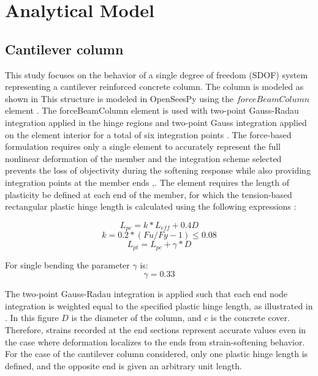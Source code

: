 \section{Analytical Model}
\subsection{Cantilever column}
This study focuses on the behavior of a single degree of freedom (SDOF) system representing a cantilever reinforced concrete column. The column is modeled as shown in  This structure is modeled in OpenSeesPy \cite{McKenna2010}\cite{Zhu2018} using the $forceBeamColumn$ element \cite{Scott}. The forceBeamColumn element is used with two-point Gauss-Radau integration applied in the hinge regions and two-point Gauss integration applied on the element interior for a total of six integration points \cite{Scott}. The force-based formulation requires only a single element to accurately represent the full nonlinear deformation of the member and the integration scheme selected prevents the loss of objectivity during the softening response while also providing integration points at the member ends \cite{Calabrese2010},\cite{Scott}. The element requires the length of plasticity be defined at each end of the member, for which the tension-based rectangular plastic hinge length is calculated using the following expressions \cite{Goodnight2013}:

\begin{equation}
    L_{pc}=k*L_{eff} + 0.4D
    \label{eq:LP_Comp}
\end{equation}
\begin{equation}
	k=0.2*(Fu/Fy - 1) \leqslant 0.08
	\label{eq:K_Lp}
\end{equation}
\begin{equation}
    L_{pt}=L_{pc}+\gamma*D
    \label{eq:LP_Tension}
\end{equation}

For single bending the parameter $\gamma$ is:
\begin{equation}
    \gamma=0.33
    \label{eq:Gamma_LPt}
\end{equation}

The two-point Gauss-Radau integration is applied such that each end node integration is weighted equal to the specified plastic hinge length, as illustrated in . In this figure $D$ is the diameter of the column, and $c$ is the concrete cover. Therefore, strains recorded at the end sections represent accurate values even in the case where deformation localizes to the ends from strain-softening behavior. For the case of the cantilever column considered, only one plastic hinge length is defined, and the opposite end is given an arbitrary unit length. 

